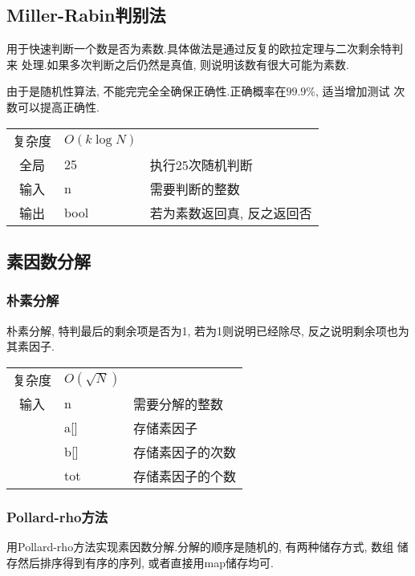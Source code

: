     \subsection{Miller-Rabin判别法}\small
用于快速判断一个数是否为素数.具体做法是通过反复的欧拉定理与二次剩余特判来
处理.如果多次判断之后仍然是真值, 则说明该数有很大可能为素数.

由于是随机性算法, 不能完完全全确保正确性.正确概率在$99.9\%$, 适当增加测试
次数可以提高正确性.

\begin{longtable}{|c|l|l|}
复杂度 & $O(k\log N)$ &  \\
全局 & 25 & 执行25次随机判断 \\
输入 & n & 需要判断的整数 \\
输出 & bool & 若为素数返回真, 反之返回否 \\
\end{longtable}



    \subsection{素因数分解}\small


        \subsubsection{朴素分解}\small
朴素分解, 特判最后的剩余项是否为1, 若为1则说明已经除尽, 反之说明剩余项也为
其素因子.

\begin{longtable}{|c|l|l|}
复杂度 & $O(\sqrt{N})$ &  \\
输入 & n & 需要分解的整数 \\
 & a[] & 存储素因子 \\
 & b[] & 存储素因子的次数 \\
 & tot & 存储素因子的个数 \\
\end{longtable}



        \subsubsection{Pollard-rho方法}\small
用Pollard-rho方法实现素因数分解.分解的顺序是随机的, 有两种储存方式, 数组
储存然后排序得到有序的序列, 或者直接用map储存均可.

